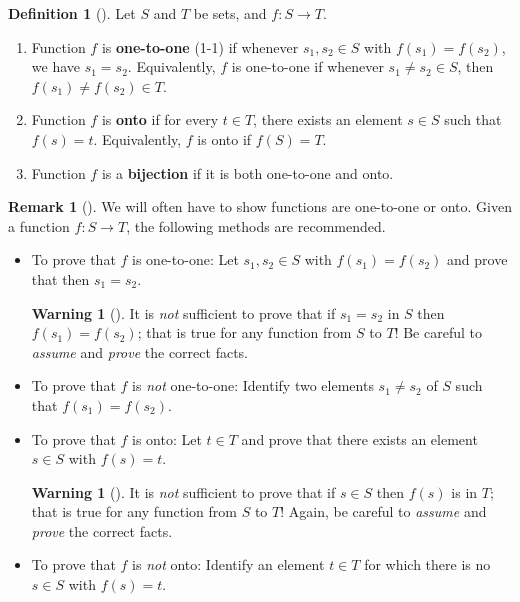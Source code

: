 \documentclass[10pt,]{book}
\newcommand{\terminology}[1]{\textbf{#1}}
\theoremstyle{plain}
\theoremstyle{definition}
\newtheorem{definition}[theorem]{Definition}
\theoremstyle{definition}
\newtheorem{remark}[theorem]{Remark}
\newtheorem{warning}[theorem]{Warning}
\theoremstyle{definition}
\theoremstyle{definition}
\numberwithin{equation}{section}
\begin{document}
\begin{definition}[{}]\label{definition-8}
Let \(S\) and \(T\) be sets, and \(f:S\to T\). \leavevmode%
\begin{enumerate}
\item\hypertarget{li-9}{}Function \(f\) is \terminology{one-to-one} (1-1) if whenever \(s_1, s_2\in S\) with \(f(s_1)=f(s_2)\), we have \(s_1=s_2\).  Equivalently, \(f\) is one-to-one if whenever \(s_1\neq s_2 \in S\), then \(f(s_1)\neq f(s_2) \in T\).%
\item\hypertarget{li-10}{}Function \(f\) is \terminology{onto} if for every \(t\in T\), there exists an element \(s\in S\) such that \(f(s)=t\).  Equivalently, \(f\) is onto if \(f(S)=T\).%
\item\hypertarget{li-11}{}Function \(f\) is a \terminology{bijection} if it is both one-to-one and onto.%
\end{enumerate}
%
\end{definition}
\begin{remark}[]\label{remark-2}
We will often have to show functions are one-to-one or onto. Given a function \(f:S\to T\), the following methods are recommended.%
\leavevmode%
\begin{itemize}[label=\textbullet]
\item{}To prove that \(f\) is one-to-one: Let \(s_1,s_2 \in S\) with \(f(s_1)=f(s_2)\) and prove that then \(s_1=s_2\).%
\par
\begin{warning}[]\label{warning-4}
It is \emph{not} sufficient to prove that if \(s_1=s_2\) in \(S\) then \(f(s_1)=f(s_2)\); that is true for any function from \(S\) to \(T\)!  Be careful to \emph{assume} and \emph{prove} the correct facts.%
\end{warning}
%
\item{}To prove that \(f\) is \emph{not} one-to-one: Identify two elements \(s_1 \neq s_2\) of \(S\) such that \(f(s_1)=f(s_2)\).%
\item{}To prove that \(f\) is onto: Let \(t\in T\) and prove that there exists an element \(s\in S\) with \(f(s)=t\).%
\par
\begin{warning}[]\label{warning-5}
It is \emph{not} sufficient to prove that if \(s\in S\) then \(f(s)\) is in \(T\); that is true for any function from \(S\) to \(T\)!  Again, be careful to \emph{assume} and \emph{prove} the correct facts.%
\end{warning}
%
\item{}To prove that \(f\) is \emph{not} onto: Identify an element \(t\in T\) for which there is no \(s\in S\) with \(f(s)=t\).%
\end{itemize}
\end{remark}
\end{document}
